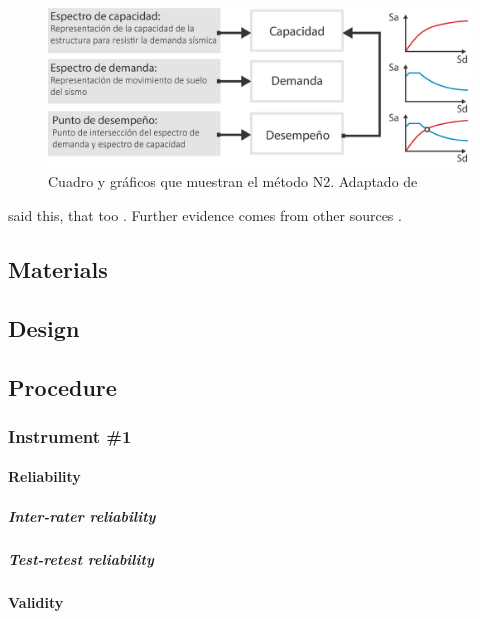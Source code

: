 \documentclass[doc, 12pt, a4paper, draftall]{apa7} %
\begin{document}
\begin{figure}[!ht]
	\centering
  \includegraphics[scale=0.36]{E_IMAGENES/3_Capitulo3/Cap3_Imagen70.png}
	\caption{\centering\footnotesize Cuadro y gráficos que muestran el método N2. Adaptado de \cite{deWaal2009}}
	\label{Cap3_Figura8}
\end{figure}

\Textcite{vonDavier2011} said this, that
too \parencite{vonDavier2011,Lassen2006}.  Further evidence comes from
other sources \parencite{Shotton1989,Lassen2006}.  \lipsum[3]
\lipsum[4]

\subsection{Materials}
\lipsum[5]

\subsection{Design}
\lipsum[6]

\subsection{Procedure}
\lipsum[7]

\subsubsection{Instrument \#1}
\lipsum[8]

\paragraph{Reliability}
\lipsum[9]

\subparagraph{Inter-rater reliability}
\lipsum[10]

\subparagraph{Test-retest reliability}
\lipsum[11]

\paragraph{Validity}
\lipsum[12]
\end{document}
